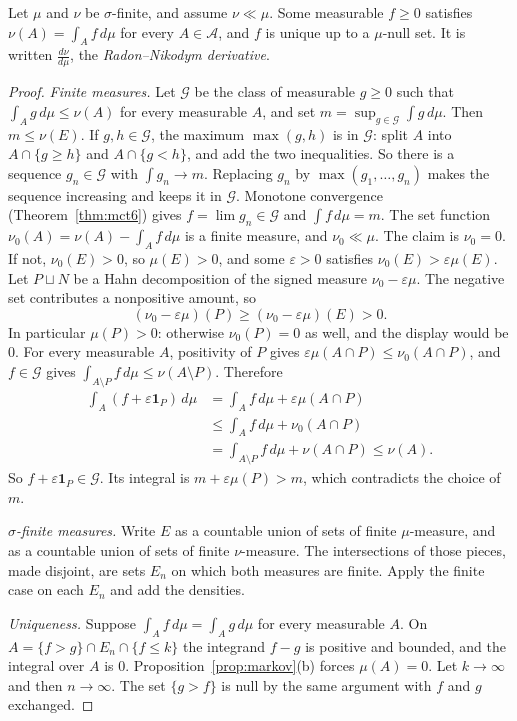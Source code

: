 \begin{theorem}\label{thm:rn}
Let $\mu$ and $\nu$ be $\sigma$-finite, and assume $\nu\ll\mu$. Some measurable $f\ge0$ satisfies $\nu(A)=\int_Af\,d\mu$ for every $A\in\mathcal A$, and $f$ is unique up to a $\mu$-null set. It is written $\frac{d\nu}{d\mu}$, the
\emph{Radon--Nikodym derivative}.
\end{theorem}
\begin{proof}
\emph{Finite measures.} Let $\mathcal G$ be the class of measurable $g\ge0$ such that $\int_Ag\,d\mu\le\nu(A)$ for every measurable $A$, and set $m=\sup_{g\in\mathcal G}\int g\,d\mu$. Then $m\le\nu(E)$. If $g,h\in\mathcal G$, the maximum $\max(g,h)$ is in $\mathcal G$: split $A$ into $A\cap\{g\ge h\}$ and $A\cap\{g<h\}$, and add the two inequalities. So there is a sequence $g_n\in\mathcal G$ with $\int g_n\to m$. Replacing $g_n$ by $\max(g_1,\dots,g_n)$ makes the sequence increasing and keeps it in $\mathcal G$. Monotone convergence (Theorem~\ref{thm:mct6}) gives $f=\lim g_n\in\mathcal G$ and $\int f\,d\mu=m$. The set function $\nu_0(A)=\nu(A)-\int_Af\,d\mu$ is a finite measure, and $\nu_0\ll\mu$. The claim is $\nu_0=0$. If not, $\nu_0(E)>0$, so $\mu(E)>0$, and some $\varepsilon>0$ satisfies $\nu_0(E)>\varepsilon\mu(E)$. Let $P\sqcup N$ be a Hahn decomposition of the signed measure $\nu_0-\varepsilon\mu$. The negative set contributes a nonpositive amount, so
\[
(\nu_0-\varepsilon\mu)(P)\ge(\nu_0-\varepsilon\mu)(E)>0.
\]
In particular $\mu(P)>0$: otherwise $\nu_0(P)=0$ as well, and the display would be $0$. For every measurable $A$, positivity of $P$ gives $\varepsilon\mu(A\cap P)\le\nu_0(A\cap P)$, and $f\in\mathcal G$ gives $\int_{A\setminus P}f\,d\mu\le\nu(A\setminus P)$. Therefore
\begin{align*}
\int_A(f+\varepsilon\mathbf 1_P)\,d\mu
&=\int_Af\,d\mu+\varepsilon\mu(A\cap P)\\
&\le\int_Af\,d\mu+\nu_0(A\cap P)\\
&=\int_{A\setminus P}f\,d\mu+\nu(A\cap P)\le\nu(A).
\end{align*}
So $f+\varepsilon\mathbf 1_P\in\mathcal G$. Its integral is $m+\varepsilon\mu(P)>m$, which contradicts the choice of $m$.

\emph{$\sigma$-finite measures.} Write $E$ as a countable union of sets of finite $\mu$-measure, and as a countable union of sets of finite $\nu$-measure. The intersections of those pieces, made disjoint, are sets $E_n$ on which both measures are finite. Apply the finite case on each $E_n$ and add the densities.

\emph{Uniqueness.} Suppose $\int_Af\,d\mu=\int_Ag\,d\mu$ for every measurable $A$. On $A=\{f>g\}\cap E_n\cap\{f\le k\}$ the integrand $f-g$ is positive and bounded, and the integral over $A$ is $0$. Proposition~\ref{prop:markov}(b) forces $\mu(A)=0$. Let $k\to\infty$ and then $n\to\infty$. The set $\{g>f\}$ is null by the same argument with $f$ and $g$ exchanged.
\end{proof}

